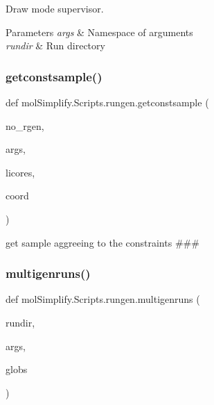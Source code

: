 Draw mode supervisor. 


\begin{DoxyParams}{Parameters}
{\em args} & Namespace of arguments \\
\hline
{\em rundir} & Run directory \\
\hline
\end{DoxyParams}
\mbox{\label{namespacemolSimplify_1_1Scripts_1_1rungen_a94e0fab8e80bd8616bf1012fe41be550}} 
\subsubsection{\texorpdfstring{getconstsample()}{getconstsample()}}
{\footnotesize\ttfamily def mol\+Simplify.\+Scripts.\+rungen.\+getconstsample (\begin{DoxyParamCaption}\item[{}]{no\+\_\+rgen,  }\item[{}]{args,  }\item[{}]{licores,  }\item[{}]{coord }\end{DoxyParamCaption})}



get sample aggreeing to the constraints \#\#\# 

\mbox{\label{namespacemolSimplify_1_1Scripts_1_1rungen_a79e1969b2072ebcc9ef17c38829d0e18}} 
\subsubsection{\texorpdfstring{multigenruns()}{multigenruns()}}
{\footnotesize\ttfamily def mol\+Simplify.\+Scripts.\+rungen.\+multigenruns (\begin{DoxyParamCaption}\item[{}]{rundir,  }\item[{}]{args,  }\item[{}]{globs }\end{DoxyParamCaption})}



